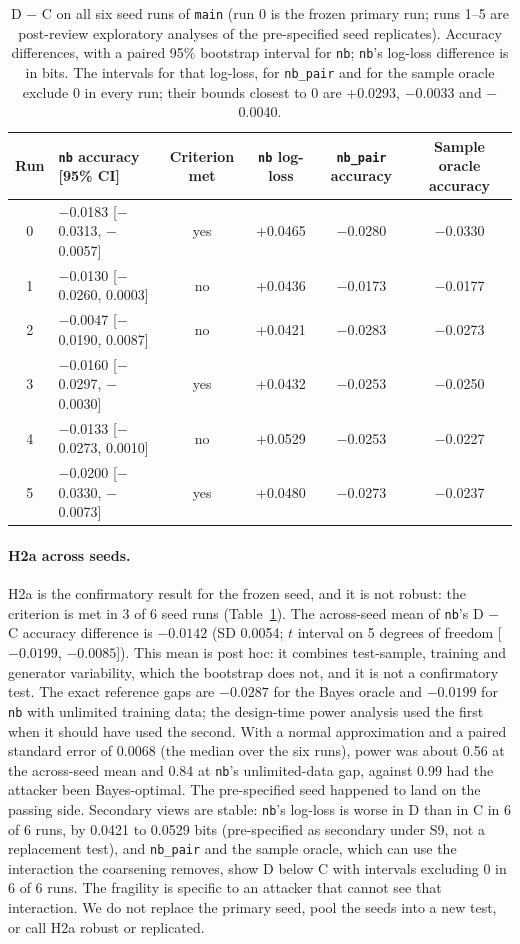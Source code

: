 \documentclass[11pt]{article}
\newcommand{\code}[1]{\texttt{#1}}
\begin{document}
\begin{table}[htbp]
\centering\footnotesize
\caption{D $-$ C on all six seed runs of \code{main} (run 0 is the frozen primary run; runs 1--5 are post-review exploratory analyses of the pre-specified seed replicates). Accuracy differences, with a paired 95\% bootstrap interval for \code{nb}; \code{nb}'s log-loss difference is in bits. The intervals for that log-loss, for \code{nb\_pair} and for the sample oracle exclude 0 in every run; their bounds closest to 0 are +0.0293, $-$0.0033 and $-$0.0040.}
\label{tab:h2a}
\begin{tabular}{@{}clcccc@{}}
\toprule
Run & \code{nb} accuracy [95\% CI] & Criterion met & \code{nb} log-loss & \code{nb\_pair} accuracy & Sample oracle accuracy \\
\midrule
0 & $-$0.0183 [$-$0.0313, $-$0.0057] & yes & +0.0465 & $-$0.0280 & $-$0.0330 \\
1 & $-$0.0130 [$-$0.0260, 0.0003] & no & +0.0436 & $-$0.0173 & $-$0.0177 \\
2 & $-$0.0047 [$-$0.0190, 0.0087] & no & +0.0421 & $-$0.0283 & $-$0.0273 \\
3 & $-$0.0160 [$-$0.0297, $-$0.0030] & yes & +0.0432 & $-$0.0253 & $-$0.0250 \\
4 & $-$0.0133 [$-$0.0273, 0.0010] & no & +0.0529 & $-$0.0253 & $-$0.0227 \\
5 & $-$0.0200 [$-$0.0330, $-$0.0073] & yes & +0.0480 & $-$0.0273 & $-$0.0237 \\
\bottomrule
\end{tabular}
\end{table}

\paragraph{H2a across seeds.} H2a is the confirmatory result for the frozen seed, and it is not robust: the criterion is met in 3 of 6 seed runs (Table~\ref{tab:h2a}). The across-seed mean of \code{nb}'s D $-$ C accuracy difference is $-0.0142$ (SD 0.0054; $t$ interval on 5 degrees of freedom [$-0.0199$, $-0.0085$]). This mean is post hoc: it combines test-sample, training and generator variability, which the bootstrap does not, and it is not a confirmatory test. The exact reference gaps are $-0.0287$ for the Bayes oracle and $-0.0199$ for \code{nb} with unlimited training data; the design-time power analysis used the first when it should have used the second. With a normal approximation and a paired standard error of 0.0068 (the median over the six runs), power was about 0.56 at the across-seed mean and 0.84 at \code{nb}'s unlimited-data gap, against 0.99 had the attacker been Bayes-optimal. The pre-specified seed happened to land on the passing side. Secondary views are stable: \code{nb}'s log-loss is worse in D than in C in 6 of 6 runs, by 0.0421 to 0.0529 bits (pre-specified as secondary under S9, not a replacement test), and \code{nb\_pair} and the sample oracle, which can use the interaction the coarsening removes, show D below C with intervals excluding 0 in 6 of 6 runs. The fragility is specific to an attacker that cannot see that interaction. We do not replace the primary seed, pool the seeds into a new test, or call H2a robust or replicated.
\end{document}
